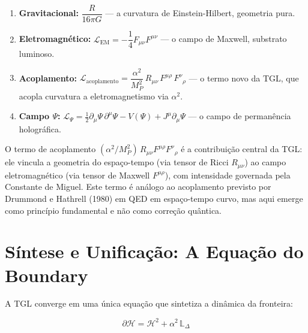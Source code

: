 \documentclass[12pt,a4paper,twoside]{article}
\newcommand{\alphaii}{\alpha^{2}}
\newcommand{\Psifield}{\Psi}
\begin{document}
\begin{enumerate}[nosep]
\item \textbf{Gravitacional:} $\dfrac{R}{16\pi G}$ --- a curvatura de Einstein-Hilbert, geometria pura.

\item \textbf{Eletromagn\'etico:} $\mathcal{L}_{\text{EM}} = -\dfrac{1}{4}F_{\mu\nu}F^{\mu\nu}$ --- o campo de Maxwell, substrato luminoso.

\item \textbf{Acoplamento:} $\mathcal{L}_{\text{acoplamento}} = \dfrac{\alphaii}{M_P^2}\,R_{\mu\nu}\,F^{\mu\rho}\,F^\nu{}_\rho$ --- o termo novo da TGL, que acopla curvatura a eletromagnetismo via $\alphaii$.

\item \textbf{Campo $\Psifield$:} $\mathcal{L}_\Psifield = \frac{1}{2}\partial_\mu\Psifield\,\partial^\mu\Psifield - V(\Psifield) + J^\mu\partial_\mu\Psifield$ --- o campo de perman\^encia hologr\'afica.
\end{enumerate}

O termo de acoplamento $(\alphaii/M_P^2)\,R_{\mu\nu}F^{\mu\rho}F^\nu{}_\rho$ \'e a contribui\c{c}\~ao central da TGL: ele vincula a geometria do espa\c{c}o-tempo (via tensor de Ricci $R_{\mu\nu}$) ao campo eletromagn\'etico (via tensor de Maxwell $F^{\mu\rho}$), com intensidade governada pela Constante de Miguel. Este termo \'e an\'alogo ao acoplamento previsto por Drummond e Hathrell (1980) em QED em espa\c{c}o-tempo curvo, mas aqui emerge como princ\'ipio fundamental e n\~ao como corre\c{c}\~ao qu\^antica.


\section{S\'intese e Unifica\c{c}\~ao: A Equa\c{c}\~ao do Boundary}


A TGL converge em uma \'unica equa\c{c}\~ao que sintetiza a din\^amica da fronteira:

\begin{equationbox}[title={Equa\c{c}\~ao Mestra da TGL}]
\begin{equation}
\boxed{\partial\mathcal{H} = \mathcal{H}^2 + \alphaii\,\mathbb{L}_\Delta}
\label{eq:mestra}
\end{equation}
\end{equationbox}
\end{document}
